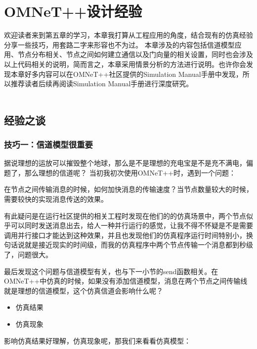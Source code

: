 \chapter{OMNeT++设计经验}

\begin{summary}
欢迎读者来到第五章的学习，本章我打算从工程应用的角度，结合现有的仿真经验分享一些技巧，用套路二字来形容也不为过。
本章涉及的内容包括信道模型应用、节点分布相关、节点之间如何建立通信以及门向量的相关设置，同时也会涉及以上代码相关的说明，简而言之，本章采用情景分析的方法进行说明。也许你会发现本章好多内容可以在OMNeT++社区提供的Simulation Manual手册中发现，所以推荐读者后续再阅读Simulation Manual手册进行深度研究。\\ \\
\end{summary}

\section{经验之谈}
\subsection{技巧一：信道模型很重要}
据说理想的运放可以摧毁整个地球，那么是不是理想的充电宝是不是充不满电，偏题了，那么理想的信道呢？
当初我初次使用OMNeT++时，遇到一个问题：

\begin{remark}
在节点之间传输消息的时候，如何加快消息的传输速度？当节点数量较大的时候，需要较快的实现消息传送的效果。
\end{remark}

有此疑问是在运行社区提供的相关工程时发现在他们的的仿真场景中，两个节点似乎可以同时发送消息出去，给人一种并行运行的感觉，让我不得不怀疑是不是需要调用并行接口才能达到这种效果，并且也发现他们的仿真程序运行时间特别小，换句话说就是接近现实的时间级，而我的仿真程序中两个节点传输一个消息都到秒级了，问题很大。

最后发现这个问题与信道模型有关，也与下一小节的send函数相关。在OMNeT++中仿真的时候，如果没有添加信道模型，消息在两个节点之间传输线就是理想的信道模型，这个仿真信道会影响什么呢？\\

\begin{itemize}
	\item 仿真结果
	\item 仿真现象
\end{itemize}

影响仿真结果好理解，仿真现象呢，那我们来看看仿真模型：

